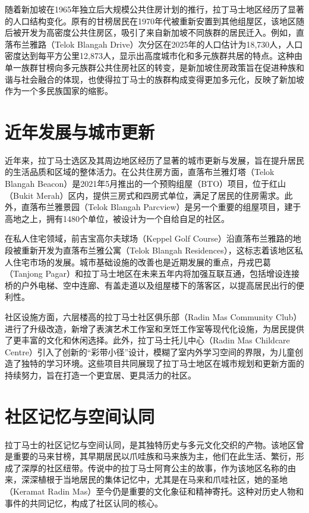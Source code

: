 \documentclass[11pt,a4paper,twoside,openany]{book}
\begin{document}
随着新加坡在1965年独立后大规模公共住房计划的推行，拉丁马士地区经历了显著的人口结构变化。原有的甘榜居民在1970年代被重新安置到其他组屋区，该地区随后被开发为高密度公共住房区，吸引了来自新加坡不同族群的居民迁入。例如，直落布兰雅路（Telok Blangah Drive）次分区在2025年的人口估计为18,730人，人口密度达到每平方公里12,873人，显示出高度城市化和多元族群共居的特点。这种由单一族群甘榜向多元族群公共住房社区的转变，是新加坡住房政策旨在促进种族和谐与社会融合的体现，也使得拉丁马士的族群构成变得更加多元化，反映了新加坡作为一个多民族国家的缩影。

\section{近年发展与城市更新}
近年来，拉丁马士选区及其周边地区经历了显著的城市更新与发展，旨在提升居民的生活品质和区域的整体活力。在公共住房方面，直落布兰雅灯塔（Telok Blangah Beacon）是2021年5月推出的一个预购组屋（BTO）项目，位于红山（Bukit Merah）区内，提供三房式和四房式单位，满足了居民的住房需求。此外，直落布兰雅景园（Telok Blangah Parcview）是另一个重要的组屋项目，建于高地之上，拥有1480个单位，被设计为一个自给自足的社区。

在私人住宅领域，前吉宝高尔夫球场（Keppel Golf Course）沿直落布兰雅路的地段被重新开发为直落布兰雅公寓（Telok Blangah Residences），这标志着该地区私人住宅市场的发展。城市基础设施的改善也是近期发展的重点，丹戎巴葛（Tanjong Pagar）和拉丁马士地区在未来五年内将加强互联互通，包括增设连接桥的户外电梯、空中连廊、有盖走道以及组屋楼下的落客区，以提高居民出行的便利性。

社区设施方面，六层楼高的拉丁马士社区俱乐部（Radin Mas Community Club）进行了升级改造，新增了表演艺术工作室和烹饪工作室等现代化设施，为居民提供了更丰富的文化和休闲选择。此外，拉丁马士托儿中心（Radin Mas Childcare Centre）引入了创新的“彩带小径”设计，模糊了室内外学习空间的界限，为儿童创造了独特的学习环境。这些项目共同展现了拉丁马士地区在城市规划和更新方面的持续努力，旨在打造一个更宜居、更具活力的社区。

\section{社区记忆与空间认同}
拉丁马士的社区记忆与空间认同，是其独特历史与多元文化交织的产物。该地区曾是重要的马来甘榜，其早期居民以爪哇族和马来族为主，他们在此生活、繁衍，形成了深厚的社区纽带。传说中的拉丁马士阿育公主的故事，作为该地区名称的由来，深深植根于当地居民的集体记忆中，尤其是在马来和爪哇社区，她的圣地（Keramat Radin Mas）至今仍是重要的文化象征和精神寄托。这种对历史人物和事件的共同记忆，构成了社区认同的核心。
\end{document}
